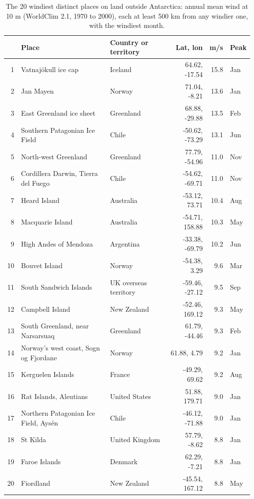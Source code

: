 \documentclass[11pt,a4paper]{article}
\begin{document}
\begin{table}[tbp]\centering\small\caption{The 20 windiest distinct places on land outside Antarctica: annual mean wind at 10 m (WorldClim 2.1, 1970 to 2000), each at least 500 km from any windier one, with the windiest month.}\label{tab:places}\begin{tabular}{rllrrl}\toprule & Place & Country or territory & Lat, lon & m/s & Peak\\\midrule
1 & Vatnajökull ice cap & Iceland & 64.62, -17.54 & 15.8 & Jan \\
2 & Jan Mayen & Norway & 71.04, -8.21 & 13.6 & Jan \\
3 & East Greenland ice sheet & Greenland & 68.88, -29.88 & 13.5 & Feb \\
4 & Southern Patagonian Ice Field & Chile & -50.62, -73.29 & 13.1 & Jun \\
5 & North-west Greenland & Greenland & 77.79, -54.96 & 11.0 & Nov \\
6 & Cordillera Darwin, Tierra del Fuego & Chile & -54.62, -69.71 & 11.0 & Nov \\
7 & Heard Island & Australia & -53.12, 73.71 & 10.4 & Aug \\
8 & Macquarie Island & Australia & -54.71, 158.88 & 10.3 & May \\
9 & High Andes of Mendoza & Argentina & -33.38, -69.79 & 10.2 & Jun \\
10 & Bouvet Island & Norway & -54.38, 3.29 & 9.6 & Mar \\
11 & South Sandwich Islands & UK overseas territory & -59.46, -27.12 & 9.5 & Sep \\
12 & Campbell Island & New Zealand & -52.46, 169.12 & 9.3 & May \\
13 & South Greenland, near Narsarsuaq & Greenland & 61.79, -44.46 & 9.3 & Feb \\
14 & Norway's west coast, Sogn og Fjordane & Norway & 61.88, 4.79 & 9.2 & Jan \\
15 & Kerguelen Islands & France & -49.29, 69.62 & 9.2 & Aug \\
16 & Rat Islands, Aleutians & United States & 51.88, 179.71 & 9.0 & Jan \\
17 & Northern Patagonian Ice Field, Aysén & Chile & -46.12, -71.88 & 9.0 & Jan \\
18 & St Kilda & United Kingdom & 57.79, -8.62 & 8.8 & Jan \\
19 & Faroe Islands & Denmark & 62.29, -7.21 & 8.8 & Jan \\
20 & Fiordland & New Zealand & -45.54, 167.12 & 8.8 & May \\
\bottomrule\end{tabular}\end{table}
\end{document}
